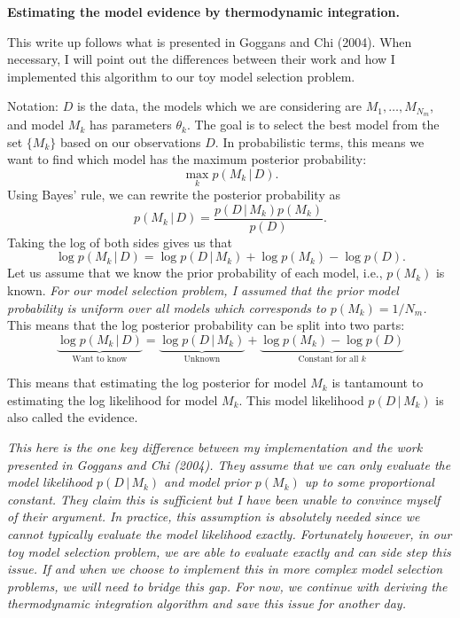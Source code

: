 \documentclass[11pt]{article}
\begin{document}
\begin{center}
	\textbf{Estimating the model evidence by thermodynamic integration.}
\end{center}
This write up follows what is presented in Goggans and Chi (2004).
When necessary, I will point out the differences between their work and how I implemented this algorithm to our toy model selection problem.


Notation: $D$ is the data, the models which we are considering are $M_1,\dots,M_{N_m}$, and model $M_k$ has parameters $\theta_k$.
The goal is to select the best model from the set $\{M_k\}$ based on our observations $D$. 
In probabilistic terms, this means we want to find which model has the maximum posterior probability:
\begin{equation}
\max_{k} p(M_k\,|\, D).
\end{equation}
Using Bayes' rule, we can rewrite the posterior probability as
\begin{equation}
p(M_k\,|\, D) = \frac{p(D\,|\, M_k)p(M_k)}{p(D)}.
\end{equation}
Taking the log of both sides gives us that
\begin{equation}
 \log  p(M_k\,|\, D) = \log p(D\,|\, M_k)+\log p(M_k) - \log p(D).
\end{equation}
Let us assume that we know the prior probability of each model, i.e., $p(M_k)$ is known.
\textit{For our model selection problem, I assumed that the prior model probability is uniform over all models which corresponds to $p(M_k) = 1/N_m$.}
This means that the log posterior probability can be split into two parts: 
\begin{equation}
\underset{\text{Want to know}}{\underbrace{\log  p(M_k\,|\, D)}}
=
\underset{\text{Unknown}}{\underbrace{\log  p(D\,|\, M_k)}}
+
\underset{\text{Constant for all }k}{\underbrace{\log p(M_k) - \log p(D)}}
\end{equation}

This means that estimating the log posterior for model $M_k$ is tantamount to estimating the log likelihood for model $M_k$.
This model likelihood $p(D\,|\, M_k)$ is also called the evidence.

\textit{This here is the one key difference between my implementation and the work presented in Goggans and Chi (2004).
They assume that we can only evaluate the model likelihood $p(D\,|\, M_k)$ and model prior $p( M_k)$ up to some proportional constant.
They claim this is sufficient but I have been unable to convince myself of their argument.
In practice, this assumption is absolutely needed since we cannot typically evaluate the model likelihood exactly.
Fortunately however, in our toy model selection problem, we are able to evaluate exactly and can side step this issue.
If and when we choose to implement this in more complex model selection problems, we will need to bridge this gap.
For now, we continue with deriving the thermodynamic integration algorithm and save this issue for another day.}
\end{document}
